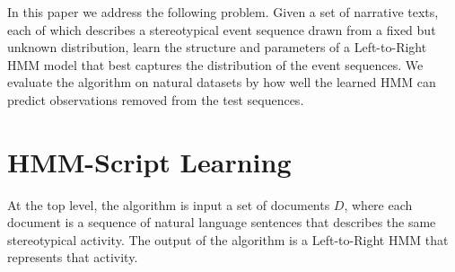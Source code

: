 \documentclass[letterpaper]{article}
\begin{document}

In this paper we address the following problem. Given a set of narrative texts, each of which describes a stereotypical event sequence drawn from a fixed but unknown distribution, learn the structure and parameters of a Left-to-Right HMM model that best captures the distribution of the event sequences. We evaluate the algorithm on natural datasets by how well the learned HMM can predict observations removed from the test sequences.  %


\section{HMM-Script Learning}
\vspace{-.05in}

At the top level, the algorithm is input a set of documents $D$, where each document is a sequence of natural language sentences that describes the same stereotypical activity.
The output of the algorithm is a Left-to-Right HMM that represents that activity. 
\end{document}
